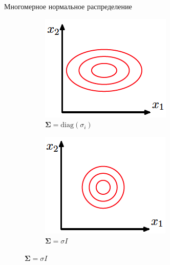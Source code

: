 \documentclass[10pt]{beamer}
\begin{document}
\begin{frame}{Многомерное нормальное распределение}
\begin{figure}
\begin{subfigure}[b]{0.23\textwidth}
                \caption{}     
        \end{subfigure}
        \begin{subfigure}[b]{0.23\textwidth}
                \includegraphics[width=\textwidth]{images/dnormal.png}
                \caption{$\mathbf{\Sigma} = \text{diag}(\sigma_i)$}
        \end{subfigure}
        \begin{subfigure}[b]{0.23\textwidth}
                \includegraphics[width=\textwidth]{images/enormal.png}
                \caption{$\mathbf{\Sigma} = \sigma I$}
        \end{subfigure}
\end{figure}

\end{frame}
\end{document}
